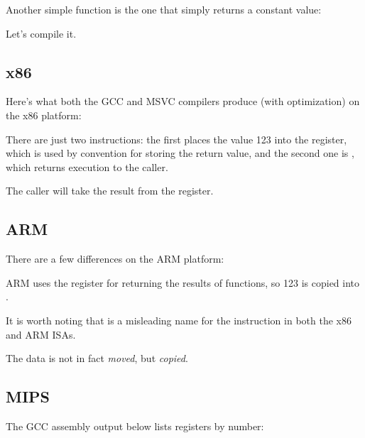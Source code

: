 \label{ret_val_func}

Another simple function is the one that simply returns a constant value:



Let's compile it.

\subsection{x86}

Here's what both the GCC and MSVC compilers produce (with optimization) on the x86 platform:



There are just two instructions: the first places the value 123 into the \EAX register,
which is used by convention for storing the return
value, and the second one is \RET, which returns execution to the \gls{caller}.

The caller will take the result from the \EAX register.

\subsection{ARM}

There are a few differences on the ARM platform:



ARM uses the register  for returning the results of functions, so 123 is copied into .

It is worth noting that \MOV is a misleading name for the instruction in both the x86 and ARM \ac{ISA}s.

The data is not in fact \emph{moved}, but \emph{copied}.

\subsection{MIPS}

\label{MIPS_leaf_function_ex1}

The GCC assembly output below lists registers by number:



